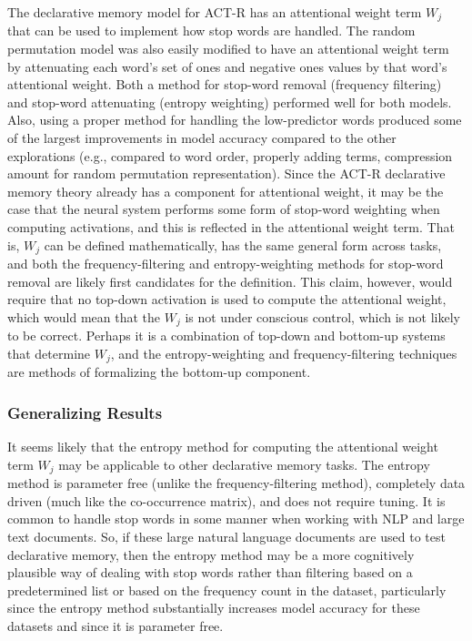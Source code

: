 \documentclass[man,floatsintext,donotrepeattitle]{apa6}
\begin{document}
The declarative memory model for ACT-R has an attentional weight term $W_{j}$ that can be used to implement how stop words are handled.
The random permutation model was also easily modified to have an attentional weight term by attenuating each word's set of ones and negative ones values by that word's attentional weight.
Both a method for stop-word removal (frequency filtering) and stop-word attenuating (entropy weighting) performed well for both models.
Also, using a proper method for handling the low-predictor words produced some of the largest improvements in model accuracy compared to the other explorations
(e.g., compared to word order, properly adding terms, compression amount for random permutation representation).
Since the ACT-R declarative memory theory already has a component for attentional weight, it may be the case that the neural system performs some form of stop-word weighting when computing activations,
and this is reflected in the attentional weight term.
That is, $W_{j}$ can be defined mathematically, has the same general form across tasks, and both the frequency-filtering and entropy-weighting methods for stop-word removal are likely first candidates for the definition.
This claim, however, would require that no top-down activation is used to compute the attentional weight, which would mean that the $W_{j}$ is not under conscious control, which is not likely to be correct.
Perhaps it is a combination of top-down and bottom-up systems that determine $W_{j}$, and the entropy-weighting and frequency-filtering techniques are methods of formalizing the bottom-up component.

\subsubsection{Generalizing Results}

It seems likely that the entropy method for computing the attentional weight term $W_{j}$ may be applicable to other declarative memory tasks.
The entropy method is parameter free (unlike the frequency-filtering method), completely data driven (much like the co-occurrence matrix), and does not require tuning.
It is common to handle stop words in some manner when working with NLP and large text documents.
So, if these large natural language documents are used to test declarative memory, then the entropy method may be a more cognitively plausible way of dealing with stop words rather than 
filtering based on a predetermined list or based on the frequency count in the dataset, particularly since the entropy method substantially increases model accuracy for these datasets and since it is parameter free.
\end{document}
